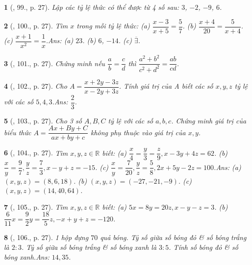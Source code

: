 \documentclass{article}
\newtheorem{baitoan}{}
\begin{document}
\begin{baitoan}[\cite{Tuyen_Toan_7}, 99., p. 27]
	Lập các tỷ lệ thức có thể được từ 4 số sau: $3$, $-2$, $-9$, $6$.
\end{baitoan}

\begin{baitoan}[\cite{Tuyen_Toan_7}, 100., p. 27]
	Tìm $x$ trong mỗi tỷ lệ thức: (a) $\dfrac{x - 3}{x + 5} = \dfrac{5}{7}$. (b) $\dfrac{x + 4}{20} = \dfrac{5}{x + 4}$. (c) $\dfrac{x + 1}{x^2} = \dfrac{1}{x}$.\hfill{\sf Ans:} (a) $23$. (b) $6$, $-14$. (c) $\overline{\exists}$.
\end{baitoan}

\begin{baitoan}[\cite{Tuyen_Toan_7}, 101., p. 27]
	Chứng minh nếu $\dfrac{a}{b} = \dfrac{c}{d}$ thì $\dfrac{a^2 + b^2}{c^2 + d^2} = \dfrac{ab}{cd}$.
\end{baitoan}

\begin{baitoan}[\cite{Tuyen_Toan_7}, 102., p. 27]
	Cho $A = \dfrac{x + 2y - 3z}{x - 2y + 3z}$. Tính giá trị của A biết các số $x,y,z$ tỷ lệ với các số $5,4,3$.\hfill{\sf Ans:} $\dfrac{2}{3}$.
\end{baitoan}

\begin{baitoan}[\cite{Tuyen_Toan_7}, 103., p. 27]
	Cho 3 số $A,B,C$ tỷ lệ với các số $a,b,c$. Chứng minh giá trị của biểu thức $A = \dfrac{Ax + By + C}{ax + by + c}$ không phụ thuộc vào giá trị của $x,y$.
\end{baitoan}

\begin{baitoan}[\cite{Tuyen_Toan_7}, 104., p. 27]
	Tìm $x,y,z\in\mathbb{R}$ biết: (a) $\dfrac{x}{4} = \dfrac{y}{3} = \dfrac{z}{9},x - 3y + 4z = 62$. (b) $\dfrac{x}{y} = \dfrac{9}{7},\dfrac{y}{z} = \dfrac{7}{3},x - y + z = -15$. (c) $\dfrac{x}{y} = \dfrac{7}{20},\dfrac{y}{z} = \dfrac{5}{8},2x + 5y - 2z = 100$.\hfill{\sf Ans:} (a) $(x,y,z) = (8,6,18)$. (b) $(x,y,z) = (-27,-21,-9)$. (c) $(x,y,z) = (14,40,64)$.
\end{baitoan}

\begin{baitoan}[\cite{Tuyen_Toan_7}, 105., p. 27]
	Tìm $x,y,z\in\mathbb{R}$ biết: (a) $5x = 8y = 20z,x - y - z = 3$. (b) $\dfrac{6}{11}x = \dfrac{9}{2}y = \dfrac{18}{5}z,-x + y + z = -120$.
\end{baitoan}

\begin{baitoan}[\cite{Tuyen_Toan_7}, 106., p. 27]
	1 hộp đựng $70$ quả bóng. Tỷ số giữa số bóng đỏ \& số bóng trắng là $2:3$. Tỷ số giữa số bóng trắng \& số bóng xanh là $3:5$. Tính số bóng đỏ \& số bóng xanh.\hfill{\sf Ans:} $14,35$.
\end{baitoan}
\end{document}
